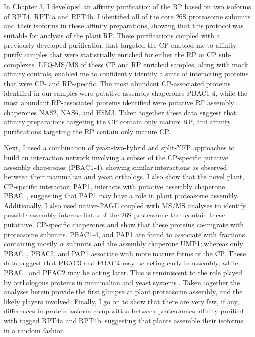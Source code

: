	In Chapter 3, I developed an affinity purification of the RP based on two isoforms of RPT4, RPT4a and RPT4b. I identified all of the core 26S proteasome subunits and their isoforms in these affinity preparations, showing that this protocol was suitable for analysis of the plant RP.  These purifications coupled with a previously developed purification that targeted the CP enabled me to affinity-purify samples that were statistically enriched for either the RP or CP sub-complexes. LFQ-MS/MS of these CP and RP enriched samples, along with mock affinity controls, enabled me to confidently identify a suite of interacting proteins that were CP- and RP-specific.  The most abundant CP-associated proteins identified in our samples were putative assembly chaperones PBAC1-4, while the most abundant RP-associated proteins identified were putative RP assembly chaperones NAS2, NAS6, and HSM3. Taken together these data suggest that affinity preparations targeting the CP contain only mature RP, and affinity purifications targeting the RP contain only mature CP. 
	
	Next, I used a combination of yeast-two-hybrid and split-YFP approaches to build an interaction network involving a subset of the CP-specific putative assembly chaperones (PBAC1-4), showing similar interactions as observed between their mammalian and yeast orthologs. I also show that the novel plant, CP-specific interactor, PAP1, interacts with putative assembly chaperone PBAC1, suggesting that PAP1 may have a role in plant proteasome assembly.  Additionally, I also used native-PAGE coupled with MS/MS analyses to identify possible assembly intermediates of the 26S proteasome that contain these putataive, CP-specific chaperones and show that these proteins co-migrate with proteasome subunits. PBAC1-4, and PAP1 are found to associate with fractions containing mostly $\alpha$ subunits and the assembly chaperone UMP1; whereas only PBAC1, PBAC2, and PAP1 associate with more mature forms of the CP. These data suggest that PBAC3 and PBAC4 may be acting early in assembly, while PBAC1 and PBAC2 may be acting later. This is reminiscent to the role played by orthologous proteins in mammalian and yeast systems \citep{le07}. Taken together the analyses herein provide the first glimpse at plant proteasome assembly, and the likely players involved. Finally, I go on to show that there are very few, if any, differences in protein isoform composition between proteasomes affinity-purified with tagged RPT4a and RPT4b, suggesting that plants assemble their isoforms in a random fashion. 

